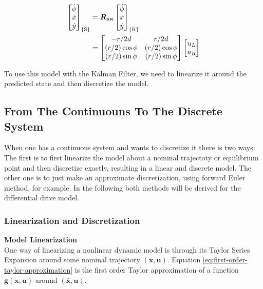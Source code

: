 \documentclass[12pt]{article}
\begin{document}
\begin{equation}
    \begin{aligned}
    \begin{bmatrix}
        \dot{\phi} \\ \dot{x} \\ \dot{y}
    \end{bmatrix}_{\{\mathrm{S}\}} &= \boldsymbol{R_{\mathsmaller{\mathrm{SR}}}} \begin{bmatrix}
         \dot{\phi} \\ \dot{x} \\ \dot{y}
    \end{bmatrix}_{\{\mathrm{R}\}} \\
    &= \begin{bmatrix}
        -r/2d & r/2d \\
        (r/2)\cos\phi & (r/2)\cos\phi \\
        (r/2)\sin\phi & (r/2)\sin\phi
    \end{bmatrix}  \begin{bmatrix} u_L \\ u_R \end{bmatrix}
    \end{aligned}
    \label{eq:continuous-diff-drive-model}
\end{equation}

To use this model with the Kalman Filter, we need to linearize it around 
the predicted state and then discretize the model.

\subsection{From The Continuouns To The Discrete System}
When one has a continuous system and wants to discretize it there is two ways: The first is to first linearize the model about a nominal trajectoty or equilibrium point and then discretize exactly, resulting in a linear and discrete model. The other one is to just make an approximate discretization, using forward Euler method, for example. In the following both methods will be derived for the differential drive model.

\subsubsection{Linearization and Discretization}
\noindent\textbf{Model Linearization} \\
One way of linearizing a nonlinear dynamic model is through its Taylor Series Expansion around some nominal trajectory $(\boldsymbol{\mathbf{x}}, \mathbf{\bar{u}})$. Equation \ref{eq:first-order-taylor-approximation} is the first order Taylor approximation of a function $\boldsymbol{g}(\mathbf{x}, \mathbf{u})$ around $(\mathbf{\bar{x}, \bar{u}})$.
\end{document}
